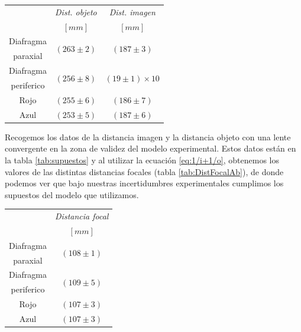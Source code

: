 \documentclass[a4paper,12pt]{article}
\newenvironment{Figure}
  {\par\medskip\noindent\minipage{\linewidth}}
  {\endminipage\par\medskip}
\begin{document}
\begin{multicols*}{2}
\begin{Figure}
            \begin{tabular}{c|c c}
                \toprule
                 & \textit{Dist. objeto} & \textit{Dist. imagen}\\
                 & \textit{$[mm]$} & \textit{$[mm]$}\\
                \midrule
                Diafragma & \multirow{2}{*}{$(263 \pm 2)$} & \multirow{2}{*}{$(187 \pm 3)$}\\
                paraxial & & \\
                Diafragma & \multirow{2}{*}{$(256 \pm 8)$} & \multirow{2}{*}{$(19 \pm 1)\times 10$}\\
                periferico & & \\ \hline
                Rojo & $(255 \pm 6)$ &$(186 \pm 7)$\\
                Azul & $(253 \pm 5)$ &$(187 \pm 6)$\\ 
                \bottomrule
            \end{tabular}

            \label{tab:supuestos}
        \end{Figure}

        Recogemos los datos de la distancia imagen y la distancia objeto con una lente convergente en la zona de validez del modelo experimental. Estos datos están en la tabla \ref{tab:supuestos} y al utilizar la ecuación \ref{eq:1/i+1/o}, obtenemos los valores de las distintas distancias focales (tabla \ref{tab:DistFocalAb}), de donde podemos ver que bajo nuestras incertidumbres experimentales cumplimos los supuestos del modelo que utilizamos.

        \begin{Figure}
            \centering
            \begin{tabular}{c|c}
                \toprule
                            & \textit{Distancia focal}        \\
                            & \textit{$[mm]$}                 \\
                \midrule
                Diafragma   & \multirow{2}{*}{$(108 \pm 1)$} \\
                paraxial    &                                 \\
                Diafragma   & \multirow{2}{*}{$(109 \pm 5)$}  \\
                periferico  &                                 \\ \hline
                Rojo        & $(107 \pm 3)$                   \\
                Azul        & $(107 \pm 3)$                   \\ 
                \bottomrule
            \end{tabular}


\end{Figure}
\end{multicols*}
\end{document}
